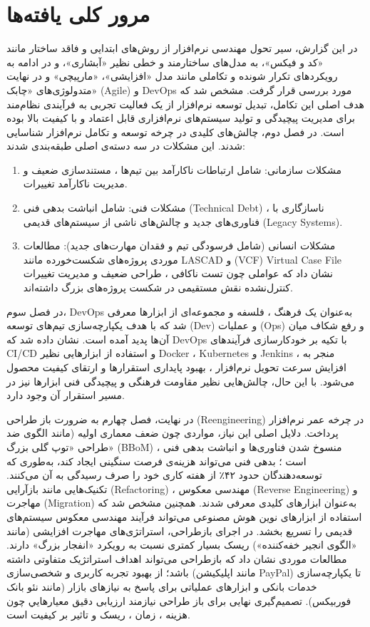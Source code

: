 \section{مرور کلی یافته‌ها}
\label{sec:ch6-findings-overview}

در این گزارش، سیر تحول مهندسی نرم‌افزار از روش‌های ابتدایی و فاقد ساختار مانند «کد و فیکس»، به مدل‌های ساختارمند و خطی نظیر «آبشاری»، و در ادامه به رویکردهای تکرار شونده و تکاملی مانند مدل «افزایشی»، «مارپیچی» و در نهایت متدولوژی‌های «چابک» (Agile) و DevOps مورد بررسی قرار گرفت. مشخص شد که هدف اصلی این تکامل، تبدیل توسعه نرم‌افزار از یک فعالیت تجربی به فرآیندی نظام‌مند برای مدیریت پیچیدگی و تولید سیستم‌های نرم‌افزاری قابل اعتماد و با کیفیت بالا بوده است.
در فصل دوم، چالش‌های کلیدی در چرخه توسعه و تکامل نرم‌افزار شناسایی شدند. این مشکلات در سه دسته‌ی اصلی طبقه‌بندی شدند:

\begin{enumerate}
    \item مشکلات سازمانی: شامل ارتباطات ناکارآمد بین تیم‌ها ، مستندسازی ضعیف و مدیریت ناکارآمد تغییرات.
    \item مشکلات فنی: شامل انباشت بدهی فنی (Technical Debt) ، ناسازگاری با فناوری‌های جدید و چالش‌های ناشی از سیستم‌های قدیمی (Legacy Systems).
    \item مشکلات انسانی (شامل فرسودگی تیم و فقدان مهارت‌های جدید): مطالعات موردی پروژه‌های شکست‌خورده مانند LASCAD و (VCF) Virtual Case File نشان داد که عواملی چون تست ناکافی ، طراحی ضعیف و مدیریت تغییرات کنترل‌نشده نقش مستقیمی در شکست پروژه‌های بزرگ داشته‌اند.
\end{enumerate}

در فصل سوم، DevOps به‌عنوان یک فرهنگ ، فلسفه و مجموعه‌ای از ابزارها معرفی شد که با هدف یکپارچه‌سازی تیم‌های توسعه (Dev) و عملیات (Ops) و رفع شکاف میان آن‌ها پدید آمده است. نشان داده شد که DevOps با تکیه بر خودکارسازی فرآیندهای CI/CD و استفاده از ابزارهایی نظیر Docker ، Kubernetes و Jenkins ، منجر به افزایش سرعت تحویل نرم‌افزار ، بهبود پایداری استقرارها و ارتقای کیفیت محصول می‌شود. با این حال، چالش‌هایی نظیر مقاومت فرهنگی و پیچیدگی فنی ابزارها نیز در مسیر استقرار آن وجود دارد.

در نهایت، فصل چهارم به ضرورت باز طراحی (Reengineering) در چرخه عمر نرم‌افزار پرداخت. دلایل اصلی این نیاز، مواردی چون ضعف معماری اولیه (مانند الگوی ضد طراحی «توپ گلی بزرگ» (BBoM) ، منسوخ شدن فناوری‌ها و انباشت بدهی فنی است ؛ بدهی فنی می‌تواند هزینه‌ی فرصت سنگینی ایجاد کند، به‌طوری که توسعه‌دهندگان حدود ۴۲٪ از هفته کاری خود را صرف رسیدگی به آن می‌کنند. تکنیک‌هایی مانند بازآرایی (Refactoring) ، مهندسی معکوس (Reverse Engineering) و مهاجرت (Migration) به‌عنوان ابزارهای کلیدی معرفی شدند. همچنین مشخص شد که استفاده از ابزارهای نوین هوش مصنوعی می‌تواند فرآیند مهندسی معکوس سیستم‌های قدیمی را تسریع بخشد. در اجرای بازطراحی، استراتژی‌های مهاجرت افزایشی (مانند «الگوی انجیر خفه‌کننده») ریسک بسیار کمتری نسبت به رویکرد «انفجار بزرگ» دارند. مطالعات موردی نشان داد که بازطراحی می‌تواند اهداف استراتژیک متفاوتی داشته باشد؛ از بهبود تجربه کاربری و شخصی‌سازی (مانند اپلیکیشن PayPal) تا یکپارچه‌سازی خدمات بانکی و ابزارهای عملیاتی برای پاسخ به نیازهای بازار (مانند نئو بانک فوربیکس). تصمیم‌گیری نهایی برای باز طراحی نیازمند ارزیابی دقیق معيارهايي چون هزینه ، زمان ، ریسک و تاثیر بر کیفیت است.
